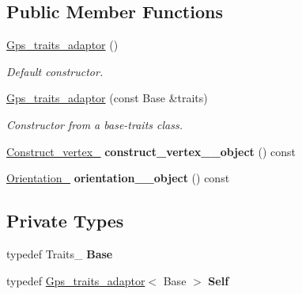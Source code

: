 \subsection*{Public Member Functions}
\begin{DoxyCompactItemize}
\item 
\mbox{\hyperlink{class_c_g_a_l_1_1_gps__traits__adaptor_a85a737a0ea42b18c1e7436000922d394}{Gps\+\_\+traits\+\_\+adaptor}} ()
\begin{DoxyCompactList}\small\item\em Default constructor. \end{DoxyCompactList}\item 
\mbox{\hyperlink{class_c_g_a_l_1_1_gps__traits__adaptor_a545dbb2f232dcc9c77f0d7a44545fc5e}{Gps\+\_\+traits\+\_\+adaptor}} (const Base \&traits)
\begin{DoxyCompactList}\small\item\em Constructor from a base-\/traits class. \end{DoxyCompactList}\item 
\mbox{\label{class_c_g_a_l_1_1_gps__traits__adaptor_a62b73c92e7421d6230385040e0cd04ed}} 
\mbox{\hyperlink{class_c_g_a_l_1_1_gps__traits__adaptor_1_1_construct__vertex__2}{Construct\+\_\+vertex\+\_}} {\bfseries construct\+\_\+vertex\+\_\+\_\+object} () const
\item 
\mbox{\label{class_c_g_a_l_1_1_gps__traits__adaptor_a6b28704d05c569e4d2f56f8754012068}} 
\mbox{\hyperlink{class_c_g_a_l_1_1_gps__traits__adaptor_1_1_orientation__2}{Orientation\+\_}} {\bfseries orientation\+\_\+\_\+object} () const
\end{DoxyCompactItemize}
\subsection*{Private Types}
\begin{DoxyCompactItemize}
\item 
\mbox{\label{class_c_g_a_l_1_1_gps__traits__adaptor_a7bb556561a8588f4429357f005b3ab45}} 
typedef Traits\+\_\+ {\bfseries Base}
\item 
\mbox{\label{class_c_g_a_l_1_1_gps__traits__adaptor_a5ce8b90a8de10f14c950d0c297a9cbf1}} 
typedef \mbox{\hyperlink{class_c_g_a_l_1_1_gps__traits__adaptor}{Gps\+\_\+traits\+\_\+adaptor}}$<$ Base $>$ {\bfseries Self}
\end{DoxyCompactItemize}


